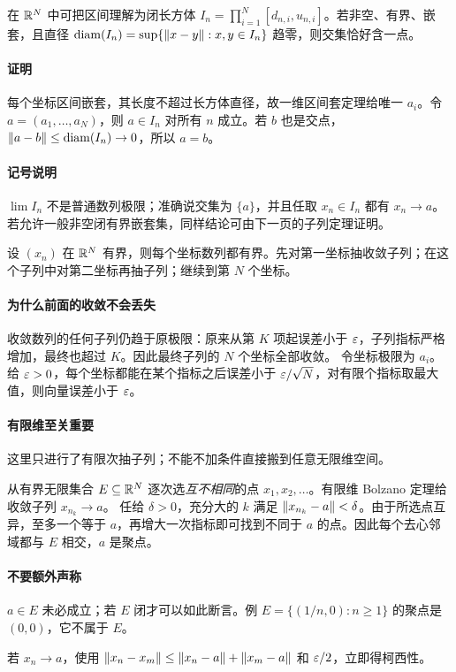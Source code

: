 在 $\mathbb{R}^N$ 中可把区间理解为闭长方体 $I_n=\prod_{i=1}^N[d_{n,i},u_{n,i}]$。若非空、有界、嵌套，且直径 $\operatorname{diam}(I_n)=\sup\{\left\lVert x-y\right\rVert:x,y\in I_n\}$ 趋零，则交集恰好含一点。
\paragraph{证明}每个坐标区间嵌套，其长度不超过长方体直径，故一维区间套定理给唯一 $a_i$。令 $a=(a_1,\ldots,a_N)$，则 $a\in I_n$ 对所有 $n$ 成立。若 $b$ 也是交点，$\left\lVert a-b\right\rVert\le\operatorname{diam}(I_n)\to0$，所以 $a=b$。
\paragraph{记号说明}$\lim I_n$ 不是普通数列极限；准确说交集为 $\{a\}$，并且任取 $x_n\in I_n$ 都有 $x_n\to a$。若允许一般非空闭有界嵌套集，同样结论可由下一页的子列定理证明。

设 $(x_n)$ 在 $\mathbb{R}^N$ 有界，则每个坐标数列都有界。先对第一坐标抽收敛子列；在这个子列中对第二坐标再抽子列；继续到第 $N$ 个坐标。
\paragraph{为什么前面的收敛不会丢失}收敛数列的任何子列仍趋于原极限：原来从第 $K$ 项起误差小于 $\varepsilon$，子列指标严格增加，最终也超过 $K$。因此最终子列的 $N$ 个坐标全部收敛。
令坐标极限为 $a_i$。给 $\varepsilon>0$，每个坐标都能在某个指标之后误差小于 $\varepsilon/\sqrt N$，对有限个指标取最大值，则向量误差小于 $\varepsilon$。
\paragraph{有限维至关重要}这里只进行了有限次抽子列；不能不加条件直接搬到任意无限维空间。

从有界无限集合 $E\subseteq\mathbb{R}^N$ 逐次选\emph{互不相同}的点 $x_1,x_2,\ldots$。有限维 Bolzano 定理给收敛子列 $x_{n_k}\to a$。
任给 $\delta>0$，充分大的 $k$ 满足 $\left\lVert x_{n_k}-a\right\rVert<\delta$。由于所选点互异，至多一个等于 $a$，再增大一次指标即可找到不同于 $a$ 的点。因此每个去心邻域都与 $E$ 相交，$a$ 是聚点。
\paragraph{不要额外声称}$a\in E$ 未必成立；若 $E$ 闭才可以如此断言。例 $E=\{(1/n,0):n\ge1\}$ 的聚点是 $(0,0)$，它不属于 $E$。

若 $x_n\to a$，使用 $\left\lVert x_n-x_m\right\rVert\le\left\lVert x_n-a\right\rVert+\left\lVert x_m-a\right\rVert$ 和 $\varepsilon/2$，立即得柯西性。
